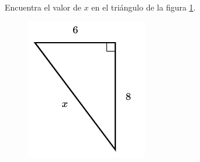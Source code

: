 Encuentra el valor de $x$ en el triángulo de la figura \ref{fig:lados_pitagoras_02}.

\begin{minipage}[t][][t]{0.35\textwidth}
    \begin{figure}[H]
        \centering
        \includegraphics[width=0.9\linewidth]{../images/lados_pitagoras_02.png}
        \caption{}
        \label{fig:lados_pitagoras_02}
    \end{figure}
\end{minipage}\hfill
